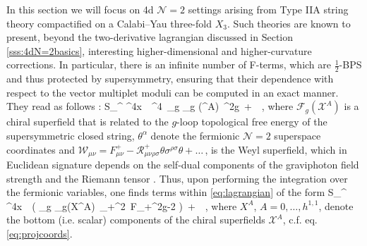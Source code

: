 In this section we will focus on 4d $\mathcal{N}=2$ settings arising from Type IIA string theory compactified on a Calabi--Yau three-fold $X_3$. Such theories are known to present, beyond the two-derivative lagrangian discussed in Section \ref{sss:4dN=2basics}, interesting higher-dimensional and higher-curvature corrections. In particular, there is an infinite number of F-terms, which are $\frac{1}{2}$-BPS and thus protected by supersymmetry, ensuring that their dependence with respect to the vector multiplet moduli can be computed in an exact manner. They read as follows \cite{Bershadsky:1993ta, Bershadsky:1993cx,Antoniadis:1993ze,Antoniadis:1995zn}:
%
\beq
\label{eq:lagrangian}
	S_{}^{} \supset \int \dd^4x\, \, \int \dd^4\theta\, \sum_{g} _g (^A)\, ^{2g}\ +\ \, ,
\eeq
%
where $\mathcal{F}_g (\mathcal{X}^A)$ is a chiral superfield that is related to the $g$-loop topological free energy of the supersymmetric closed string, $\theta^{\alpha}$ denote the fermionic $\mathcal{N}=2$ superspace coordinates and $\mathcal{W}_{\mu \nu} = F^+_{\mu \nu} - \mathcal{R}^+_{\mu \nu \rho \sigma} \theta \sigma^{\rho \sigma} \theta + \ldots\,$, is the Weyl superfield, which in Euclidean signature depends on the self-dual components of the graviphoton field strength and the Riemann tensor \cite{Antoniadis:1995zn}. Thus, upon performing the integration over the fermionic variables, one finds terms within \eqref{eq:lagrangian} of the form
%
\beq
\label{eq:GVterms}
	S_{}^{} \supset \int \dd^4x\, \, \left( \sum_{g} _g(X^A)\, _+^2\, F_+^{2g-2} \right)\ +\ \, ,
\eeq
%
where $X^A$, $A=0,\ldots, h^{1,1}$, denote the bottom (i.e. scalar) components of the chiral superfields $\mathcal{X}^A$, c.f. eq. \eqref{eq:projcoords}.

